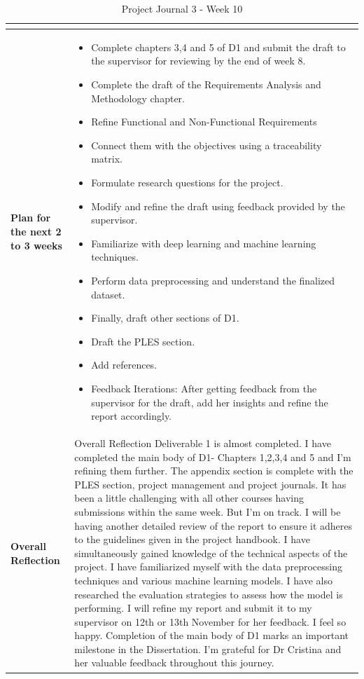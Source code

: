 \begin{longtable}{|p{4cm}|p{11cm}|}
\begin{itemize}
\end{itemize} \\
\hline
\textbf{Plan for the next 2 to 3 weeks} &
\begin{itemize}
\item Complete chapters 3,4 and 5 of D1 and submit the draft to the supervisor for reviewing by the end of week 8.
\item Complete the draft of the Requirements Analysis and Methodology chapter.
\item Refine Functional and Non-Functional Requirements 
\item Connect them with the objectives using a traceability matrix.
\item Formulate research questions for the project.
\item Modify and refine the draft using feedback provided by the supervisor.
\item Familiarize with deep learning and machine learning techniques.
\item Perform data preprocessing and understand the finalized dataset. 
\item Finally, draft other sections of D1.
\item Draft the PLES section.
\item Add references. 
\item Feedback Iterations: After getting feedback from the supervisor for the draft, add her insights and refine the report accordingly. 

\end{itemize} \\
\hline
\textbf{Overall Reflection} &
Overall Reflection	Deliverable 1 is almost completed. I have completed the main body of D1- Chapters 1,2,3,4 and 5 and I’m refining them further. The appendix section is complete with the PLES section, project management and project journals. It has been a little challenging with all other courses having submissions within the same week. But I’m on track. I will be having another detailed review of the report to ensure it adheres to the guidelines given in the project handbook.
I have simultaneously gained knowledge of the technical aspects of the project. I have familiarized myself with the data preprocessing techniques and various machine learning models. I have also researched the evaluation strategies to assess how the model is performing. I will refine my report and submit it to my supervisor on 12th or 13th November for her feedback.  I feel so happy. Completion of the main body of D1 marks an important milestone in the Dissertation. I’m grateful for Dr Cristina and her valuable feedback throughout this journey. 

\hline
\caption{ Project Journal 3 - Week 10}
\end{longtable}
\label{tab:journal1_dissertation_communication}

